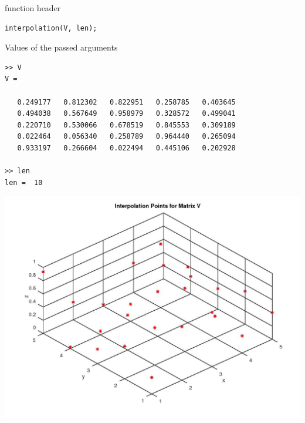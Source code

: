 \documentclass[fleqn]{article}
\begin{document}
function header
\vspace{2mm}
\begin{small}
\begin{tcolorbox}
\begin{verbatim}
interpolation(V, len);
\end{verbatim}
\end{tcolorbox}
\end{small}

Values of the passed arguments
\vspace{2mm}
\begin{small}
\begin{tcolorbox}
\begin{verbatim}
>> V
V =

   0.249177   0.812302   0.822951   0.258785   0.403645
   0.494038   0.567649   0.958979   0.328572   0.499041
   0.220710   0.530066   0.678519   0.845553   0.309189
   0.022464   0.056340   0.258789   0.964440   0.265094
   0.933197   0.266604   0.022494   0.445106   0.202928

>> len
len =  10
\end{verbatim}
\end{tcolorbox}
\end{small}

\newpage

\includegraphics[scale=0.5, inner]{V_plot3}

\vspace{10mm}
\end{document}
